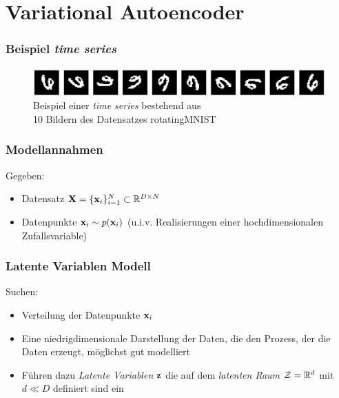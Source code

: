 

\author[Jannis Klingler]{Nix}


\beamertemplatenavigationsymbolsempty{}




\section{Variational Autoencoder}

\begin{frame}
	\frametitle{Beispiel \emph{time series}}
	\begin{figure}[!htbp]
		\includegraphics[scale=0.25]{Bilder/rotatingMNIST}
		\caption{Beispiel einer \emph{time series} bestehend aus \\10 Bildern des Datensatzes rotatingMNIST}
	\end{figure}
\end{frame}

\begin{frame}
	\frametitle{Modellannahmen}
	Gegeben:
	\begin{itemize}
		\item Datensatz $\textbf{X} = \lbrace\mathbf{x}_i \rbrace_{i=1}^{N} \subset \mathbb{R}^{D\times N}$
		\item Datenpunkte $\mathbf{x}_i\sim p(\mathbf{x}_i)$ (u.i.v. Realisierungen einer hochdimensionalen Zufallsvariable)
	\end{itemize}
\end{frame}

\begin{frame}
	\frametitle{Latente Variablen Modell}
	Suchen:
	\begin{itemize}
		\item Verteilung der Datenpunkte $\mathbf{x}_i$
		\item Eine niedrigdimensionale Darstellung der Daten, die den Prozess, der die Daten erzeugt, möglichst gut modelliert
		\item Führen dazu \emph{Latente Variablen} $\mathbf{z}$ die auf dem \emph{latenten Raum} $\mathcal{Z} = \mathbb{R}^d$ mit $d\ll D$ definiert sind ein
	\end{itemize}
\end{frame}

